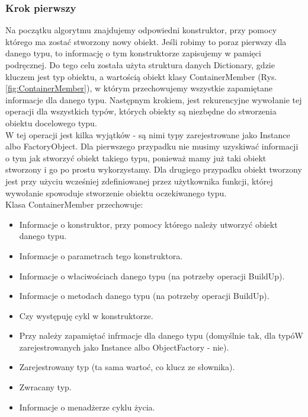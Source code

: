 \documentclass[12pt]{article}
\begin{document}
\subsubsection{Krok pierwszy}
Na początku algorytmu znajdujemy odpowiedni konstruktor, przy pomocy którego ma zostać stworzony nowy obiekt. Jeśli robimy to poraz pierwszy dla danego typu, to informację o tym konstruktorze zapisujemy w pamięci podręcznej. Do tego celu została użyta struktura danych Dictionary, gdzie kluczem jest typ obiektu, a wartością obiekt klasy ContainerMember (Rys. \ref{fig:ContainerMember}), w którym przechowujemy wszystkie zapamiętane informacje dla danego typu. Następnym krokiem, jest rekurencyjne wywołanie tej operacji dla wszystkich typów, których obiekty są niezbędne do stworzenia obiektu docelowego typu.\\
W tej operacji jest kilka wyjątków - są nimi typy zarejestrowane jako Instance albo FactoryObject. Dla pierwszego przypadku nie musimy uzyskiwać informacji o tym jak stworzyć obiekt takiego  typu, ponieważ mamy już taki obiekt stworzony i go po prostu wykorzystamy. Dla drugiego przypadku obiekt tworzony jest przy użyciu wcześniej zdefiniowanej przez użytkownika funkcji, której wywołanie spowoduje stworzenie obiektu oczekiwanego typu.\\

Klasa ContainerMember przechowuje:
\begin{itemize}
	\item Informacje o konstruktor, przy pomocy którego należy utworzyć obiekt danego typu.
	\item Informacje o parametrach tego konstruktora.
	\item Informacje o właciwościach danego typu (na potrzeby operacji BuildUp).
	\item Informacje o metodach danego typu (na potrzeby operacji BuildUp).
	\item Czy występuję cykl w konstruktorze.
	\item Przy należy zapamiętać infrmacje dla danego typu (domyślnie tak, dla typóW zarejestrowanych jako Instance albo ObjectFactory - nie).
	\item Zarejestrowany typ (ta sama wartoć, co klucz ze słownika).
	\item Zwracany typ.
	\item Informacje o menadżerze cyklu życia.
\end{itemize}
\end{document}
